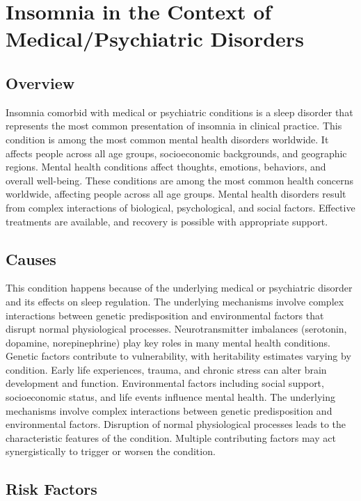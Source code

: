 \chapter{Insomnia in the Context of Medical/Psychiatric Disorders}
\label{sec:Insomnia in the Context of Medical Psychiatric Disorders}

\section{Overview}
Insomnia comorbid with medical or psychiatric conditions is a sleep disorder that represents the most common presentation of insomnia in clinical practice. This condition is among the most common mental health disorders worldwide. It affects people across all age groups, socioeconomic backgrounds, and geographic regions. Mental health conditions affect thoughts, emotions, behaviors, and overall well-being. These conditions are among the most common health concerns worldwide, affecting people across all age groups. Mental health disorders result from complex interactions of biological, psychological, and social factors. Effective treatments are available, and recovery is possible with appropriate support.
\section{Causes}
This condition happens because of the underlying medical or psychiatric disorder and its effects on sleep regulation. The underlying mechanisms involve complex interactions between genetic predisposition and environmental factors that disrupt normal physiological processes. Neurotransmitter imbalances (serotonin, dopamine, norepinephrine) play key roles in many mental health conditions. Genetic factors contribute to vulnerability, with heritability estimates varying by condition. Early life experiences, trauma, and chronic stress can alter brain development and function. Environmental factors including social support, socioeconomic status, and life events influence mental health. The underlying mechanisms involve complex interactions between genetic predisposition and environmental factors. Disruption of normal physiological processes leads to the characteristic features of the condition. Multiple contributing factors may act synergistically to trigger or worsen the condition.
\section{Risk Factors}


